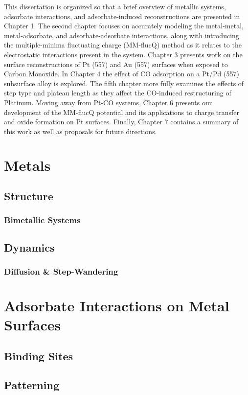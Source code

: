 This dissertation is organized so that a brief overview of metallic systems,
adsorbate interactions, and adsorbate-induced reconstructions are presented in
Chapter 1. The second chapter focuses on accurately modeling the metal-metal,
metal-adsorbate, and adsorbate-adsorbate interactions, along with introducing
the multiple-minima fluctuating charge (MM-flucQ) method as it relates to the
electrostatic interactions present in the system. Chapter 3 presents work
on the surface reconstructions of Pt (557) and Au (557) surfaces when exposed
to Carbon Monoxide. In Chapter 4 the effect of CO adsorption on a Pt/Pd (557)
subsurface alloy is explored. The fifth chapter more fully examines the effects
of step type and plateau length as they affect the CO-induced restructuring of
Platinum. Moving away from Pt-CO systems, Chapter 6 presents our development of
the MM-flucQ potential and its applications to charge transfer and oxide
formation on Pt surfaces. Finally, Chapter 7 contains a summary of this
work as well as proposals for future directions.

\section{Metals}


\subsection{Structure}
\subsubsection{Bimetallic Systems}
\subsection{Dynamics}
\subsubsection{Diffusion \& Step-Wandering}

\section{Adsorbate Interactions on Metal Surfaces}
\subsection{Binding Sites}
\subsection{Patterning}

